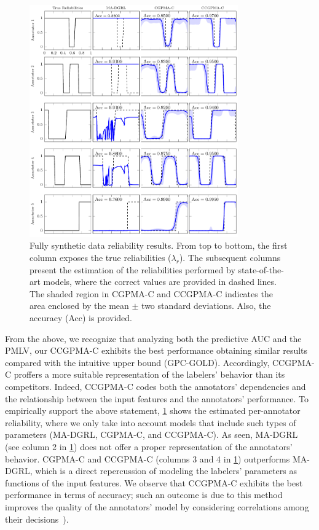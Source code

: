 \documentclass[journal]{IEEEtran}
\begin{document}
\begin{figure}[!tb]
	\centering
	\includegraphics[width = 0.8\textwidth]{Figures/VarEXpC.pdf}
	\caption{Fully synthetic data reliability results. From top to bottom, the first column exposes the true reliabilities ($\lambda_r$). The subsequent columns present the estimation of the reliabilities performed by state-of-the-art models, where the correct values are provided in dashed lines. The shaded region in CGPMA-C and CCGPMA-C indicates the area enclosed by the mean $\pm$ two standard deviations.  Also, the accuracy (Acc) is provided.}
	\label{fig:ExpCla}
\end{figure}
From the above, we recognize that analyzing both the predictive AUC and the PMLV, our CCGPMA-C exhibits the best performance obtaining similar results compared with the intuitive upper bound (GPC-GOLD). Accordingly, CCGPMA-C proffers a more suitable representation of the labelers' behavior than its competitors. Indeed, CCGPMA-C codes both the annotators' dependencies and the relationship between the input features and the annotators' performance. To empirically support the above statement, \cref{fig:ExpCla} shows the estimated per-annotator reliability, where we only take into account models that include such types of parameters (MA-DGRL, CGPMA-C, and CCGPMA-C). As seen, MA-DGRL (see column 2 in \cref{fig:ExpCla}) does not offer a proper representation of the annotators' behavior. CGPMA-C and CCGPMA-C (columns 3 and 4 in \cref{fig:ExpCla}) outperforms MA-DGRL, which is a direct repercussion of modeling the labelers' parameters as functions of the input features. We observe that CCGPMA-C exhibits the best performance in terms of accuracy; such an outcome is due to this method improves the quality of the annotators' model by considering correlations among their decisions~\cite{zhu2019unsupervised,gil2018learning}).
\end{document}
